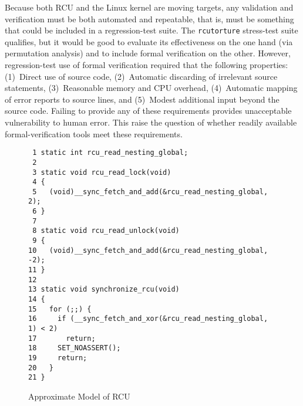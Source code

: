 \documentclass[conference]{IEEEtran}
\newcommand{\co}[1]{\lstinline[breaklines=yes,breakatwhitespace=yes]{#1}}
\begin{document}
\begin{comment}
\emph{Should we cite this? 
\url{http://conf.researchr.org/event/pldi2015/pldi2015-papers-verifying-read-copy-update-in-a-logic-for-weak-memory}}
\end{comment}

Because both RCU and the Linux kernel are moving targets, any validation
and verification must be both automated and repeatable, that is, must be
something that could be included in a regression-test suite.
The \co{rcutorture} stress-test suite qualifies, but it would be
good to evaluate its effectiveness on the one hand
(via permutation analysis)
and to include formal verification on the other.
However, regression-test use of formal verification required that
the following properties:
(1)~Direct use of source code,
(2)~Automatic discarding of irrelevant source statements,
(3)~Reasonable memory and CPU overhead,
(4)~Automatic mapping of error reports to source lines, and
(5)~Modest additional input beyond the source code.
Failing to provide any of these requirements provides unacceptable
vulnerability to human error.
This raise the question of whether readily available formal-verification
tools meet these requirements.

\begin{figure}[tb]
{ \scriptsize
\begin{verbatim}
 1 static int rcu_read_nesting_global;
 2 
 3 static void rcu_read_lock(void)
 4 {
 5   (void)__sync_fetch_and_add(&rcu_read_nesting_global, 2);
 6 }
 7 
 8 static void rcu_read_unlock(void)
 9 {
10   (void)__sync_fetch_and_add(&rcu_read_nesting_global, -2);
11 }
12 
13 static void synchronize_rcu(void)
14 {
15   for (;;) {
16     if (__sync_fetch_and_xor(&rcu_read_nesting_global, 1) < 2)
17       return;
18     SET_NOASSERT();
19     return;
20   }
21 }
\end{verbatim}
}
\caption{Approximate Model of RCU}
\label{fig:Approximate Model of RCU}
\end{figure}
\end{document}
